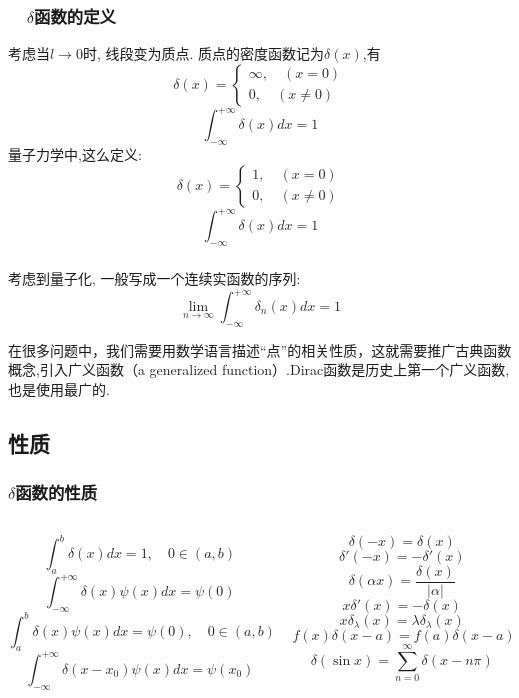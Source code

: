 \begin{frame}
	  \frametitle{~~$\delta$函数的定义}	 
	{\Bullet} 考虑当$l \to 0$时, 线段变为质点. 质点的密度函数记为$\delta(x)$,有
	\[\delta(x)=\left\{\begin{array}{c}
		\infty, \quad(x=0) \\
		0, \quad(x \neq 0)
		\end{array}\right. \]
	\[\int_{-\infty}^{+\infty} \delta(x) d x=1 \]
	量子力学中,这么定义:
	\[\delta(x)=\left\{\begin{array}{c}
		1, \quad(x=0) \\
		0, \quad(x \neq 0)
		\end{array}\right. \]
	\[\int_{-\infty}^{+\infty} \delta(x) d x=1 \]
\end{frame}

\begin{frame}
	  \frametitle{}
	  考虑到量子化, 一般写成一个连续实函数的序列: 
	  \[\lim_{n\to\infty} \int_{-\infty}^{+\infty} \delta_n (x) d x=1 \]

	  {\Tips} 在很多问题中，我们需要用数学语言描述“点”的相关性质，这就需要推广古典函数概念,引入广义函数（a generalized function）.Dirac函数是历史上第一个广义函数,也是使用最广的.
\end{frame}

\subsection{性质}
\begin{frame}
	\frametitle{$\delta$函数的性质}
	\begin{columns}
		\begin{column}[t]{0.46\linewidth}
			\[\int_{a}^{b} \delta(x) d x=1 , \quad 0\in(a,b)\]
			\[\int_{-\infty}^{+\infty} \delta(x) \psi (x) d x=\psi  (0) \]
			\[\int_{a}^{b} \delta(x) \psi (x) d x=\psi (0)  , \quad 0\in(a,b)\]
			\[ \int_{-\infty}^{+\infty} \delta(x-x_0) \psi (x) d x=\psi  (x_0) \]
		\end{column}
		\begin{column}[t]{0.46\linewidth}
	  \[ \delta(-x)=\delta(x)\]
	  \[ \delta'( -x ) = - \delta'( x ) \]
	  \[ \delta(\alpha x ) = \frac{\delta( x ) }{\left|\alpha \right|} \]
	  \[ x\delta'( x ) = - \delta( x ) \]
	  \[ x\delta_{\lambda}( x ) = \lambda \delta_{\lambda}( x ) \]
	  \[ f(x)\delta( x-a ) = f(a)\delta( x-a ) \]
	  \[ \delta( \sin x ) = \sum_{n=0}^{\infty} \delta(x-n\pi)\]
		\end{column}
	\end{columns}
\end{frame}

